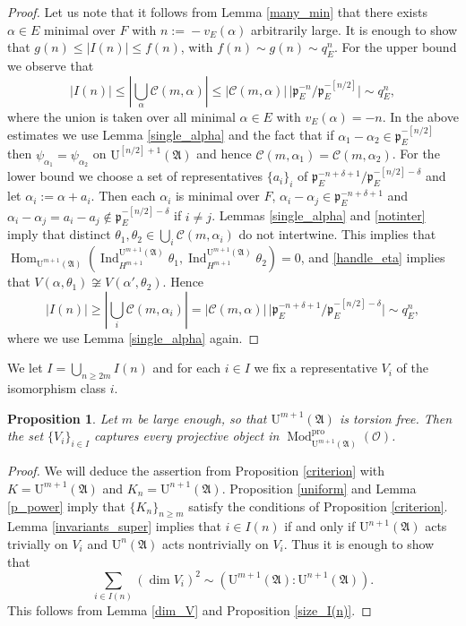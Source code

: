 \documentclass[11pt]{article}
\let\mathcal\mathscr
\newtheorem{prop}{Proposition}[section]
\theoremstyle{definition}
\DeclareMathOperator{\Hom}{Hom}
\DeclareMathOperator{\Ind}{Ind}
\DeclareMathOperator{\Mod}{Mod}
\newcommand{\Indu}[3]{\Ind_{#1}^{#2}{#3}}
\newcommand{\Aa}{\mathfrak A}
\newcommand{\cO}{\mathcal{O}}
\newcommand{\pp}{\mathfrak p}
\newcommand{\pro}{\mathrm{pro}}
\newcommand{\UU}{\mathrm U}
\begin{document}
\begin{proof} Let us note that it follows from Lemma \ref{many_min} that there exists $\alpha\!\in\!E$ minimal over $F$ with $n\!:=\!-v_E(\alpha)$ arbitrarily large.
It is enough to show that \hbox{$g(n)\!\le\!| I(n)|\!\le\!f(n)$}, with $f(n)\sim g(n) \sim q_E^n$. For the upper bound we observe that
\[\textstyle
| I(n)| \le |\bigcup_{\alpha} \mathcal C(m, \alpha)| \le |\mathcal C(m, \alpha)|\, \bigl| \pp_E^{-n}/ \pp_E^{-[n/2]}\bigr| \sim q_E^n,
\]
where the union is taken over all minimal $\alpha\in E$ with $v_E(\alpha)=-n$. In the above estimates we use Lemma \ref{single_alpha} and
the fact that if $\alpha_1-\alpha_2\in \pp_E^{-[n/2]}$ then $\psi_{\alpha_1}=\psi_{\alpha_2}$ on $\UU^{[n/2]+1}(\Aa)$ and hence $\mathcal C(m, \alpha_1)=\mathcal C(m, \alpha_2)$.
For the lower bound we choose a set of representatives $\{a_i\}_i$ of $\pp_E^{-n+\delta+1}/\pp_E^{-[n/2]-\delta}$ and let $\alpha_i:= \alpha+a_i$. Then each $\alpha_i$ is minimal over $F$,
$\alpha_i - \alpha_j \in \pp_E^{-n +\delta+1}$ and $\alpha_i -\alpha_j= a_i-a_j\not \in \pp_E^{-[n/2]-\delta}$ if $i\neq j$. Lemmas \ref{single_alpha} and \ref{notinter} imply that
distinct $\theta_1, \theta_2\in \bigcup_i \mathcal C(m, \alpha_i)$ do not intertwine. This implies that $\Hom_{\UU^{m+1}(\Aa)}(\Indu{H^{m+1}}{\UU^{m+1}(\Aa)}{\theta_1},
\Indu{H^{m+1}}{\UU^{m+1}(\Aa)}{\theta_2})=0$, and \eqref{handle_eta} implies that
$V(\alpha, \theta_1)\not\cong V(\alpha', \theta_2)$. Hence
\[\textstyle
|I(n)|\ge |\bigcup_i \mathcal C(m, \alpha_i)|= |\mathcal C(m, \alpha)|\, \bigl| \pp_E^{-n+\delta+1}/\pp_E^{-[n/2]-\delta}\bigr|\sim q_E^n,
\]
where we use Lemma \ref{single_alpha} again.
\end{proof}

We let $I=\bigcup_{n\ge 2m} I(n)$ and for each $i\in I$ we fix a representative $V_i$ of the isomorphism class $i$.

\begin{prop}\label{capture_super} Let $m$ be large enough, so that $\UU^{m+1}(\Aa)$ is torsion free. Then the set $\{V_i\}_{i\in I}$ captures every projective object in $\Mod^{\pro}_{\UU^{m+1}(\Aa)}(\cO)$.
\end{prop}

\begin{proof} We will deduce the assertion from Proposition \ref{criterion} with $K=\UU^{m+1}(\Aa)$ and $K_n=\UU^{n+1}(\Aa)$. Proposition \ref{uniform} and Lemma \ref{p_power} imply that
$\{K_n\}_{n\ge m}$ satisfy the conditions of Proposition \ref{criterion}. Lemma \ref{invariants_super} implies that $i\in I(n)$ if and only if $\UU^{n+1}(\Aa)$ acts trivially on $V_i$ and
$\UU^n(\Aa)$ acts nontrivially on $V_i$. Thus it is enough to show that
\[
\sum_{i\in I(n)} (\dim V_i)^2 \sim (\UU^{m+1}(\Aa): \UU^{n+1}(\Aa)).
\]
This follows from Lemma \ref{dim_V} and Proposition \ref{size_I(n)}.
\end{proof}
\end{document}
